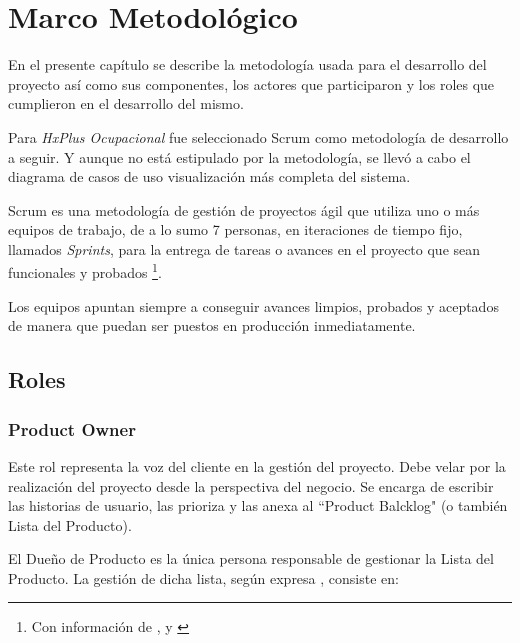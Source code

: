 \chapter{Marco Metodológico}

    En el presente capítulo se describe la metodología usada para el desarrollo del proyecto así como sus componentes, los actores que participaron y los roles que cumplieron en el desarrollo del mismo.

    Para \textit{HxPlus Ocupacional} fue seleccionado Scrum como metodología de desarrollo a seguir. Y aunque no está estipulado por la metodología, se llevó a cabo el diagrama de casos de uso visualización más completa del sistema.
    
    Scrum es una metodología de gestión de proyectos ágil que utiliza uno o más equipos de trabajo, de a lo sumo 7 personas, en iteraciones de tiempo fijo, llamados \textit{Sprints}, para la entrega de tareas o avances en el proyecto que sean funcionales y probados
    \footnote{Con información de \citeauthor{scrum-guia}\cite{scrum-guia}, \citeauthor{scrum-primer}\cite{scrum-primer} y \citeauthor{scrum-agile}\cite{scrum-agile}}.    
    
    Los equipos apuntan siempre a conseguir avances limpios, probados y aceptados de manera que puedan ser puestos en producción inmediatamente.
    

    \section{Roles}
        
        \subsection{Product Owner}
        \label{product-owner}
        
        Este rol representa la voz del cliente en la gestión del proyecto. Debe velar por la realización del proyecto desde la perspectiva del negocio. Se encarga de escribir las historias de usuario, las prioriza y las anexa al ``Product Balcklog" (o también Lista del Producto).
        
        El Dueño de Producto es la única persona responsable de gestionar la Lista del Producto. La gestión de dicha lista, según expresa \citeauthor{scrum-guia}\cite{scrum-guia}, consiste en:
        

